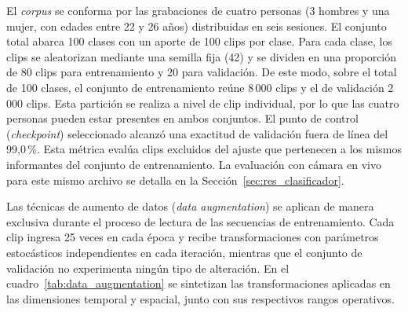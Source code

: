 El \textit{corpus} se conforma por las grabaciones de cuatro personas (3 hombres y una mujer, con edades entre 22 y 26 años) distribuidas en seis sesiones. El conjunto total abarca 100 clases con un aporte de 100 clips por clase. Para cada clase, los clips se aleatorizan mediante una semilla fija (42) y se dividen en una proporción de 80 clips para entrenamiento y 20 para validación. De este modo, sobre el total de 100 clases, el conjunto de entrenamiento reúne 8\,000 clips y el de validación 2\,000 clips. Esta partición se realiza a nivel de clip individual, por lo que las cuatro personas pueden estar presentes en ambos conjuntos. El punto de control (\textit{checkpoint}) seleccionado alcanzó una exactitud de validación fuera de línea del 99{,}0\,\%. Esta métrica evalúa clips excluidos del ajuste que pertenecen a los mismos informantes del conjunto de entrenamiento. La evaluación con cámara en vivo para este mismo archivo se detalla en la Sección~\ref{sec:res_clasificador}.


Las técnicas de aumento de datos (\textit{data augmentation}) se aplican de manera exclusiva durante el proceso de lectura de las secuencias de entrenamiento. Cada clip ingresa 25 veces en cada época y recibe transformaciones con parámetros estocásticos independientes en cada iteración, mientras que el conjunto de validación no experimenta ningún tipo de alteración. En el cuadro~\ref{tab:data_augmentation} se sintetizan las transformaciones aplicadas en las dimensiones temporal y espacial, junto con sus respectivos rangos operativos.

